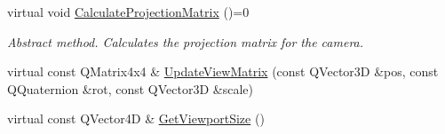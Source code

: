 \begin{DoxyCompactItemize}
\item 
\mbox{\label{class_geometry_engine_1_1_geometry_item_utils_1_1_viewport_ac3800978fbb78fd90a9a9f20c0032e9d}} 
virtual void \mbox{\hyperlink{class_geometry_engine_1_1_geometry_item_utils_1_1_viewport_ac3800978fbb78fd90a9a9f20c0032e9d}{Calculate\+Projection\+Matrix}} ()=0
\begin{DoxyCompactList}\small\item\em Abstract method. Calculates the projection matrix for the camera. \end{DoxyCompactList}\item 
virtual const Q\+Matrix4x4 \& \mbox{\hyperlink{class_geometry_engine_1_1_geometry_item_utils_1_1_viewport_a3a6f1e8286670aa78e21631e6f3ca80b}{Update\+View\+Matrix}} (const Q\+Vector3D \&pos, const Q\+Quaternion \&rot, const Q\+Vector3D \&scale)
\item 
virtual const Q\+Vector4D \& \mbox{\hyperlink{class_geometry_engine_1_1_geometry_item_utils_1_1_viewport_a0b5e2284b8a56be19d9f39a1b88c5eba}{Get\+Viewport\+Size}} ()
\end{DoxyCompactItemize}
